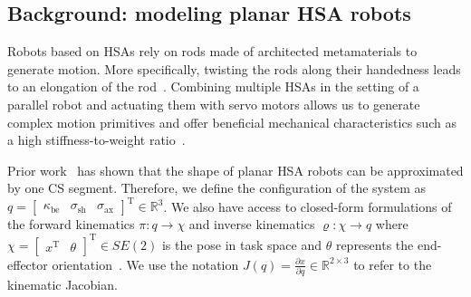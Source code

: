 \subsection{Background: modeling planar HSA robots}
Robots based on \glspl{HSA} rely on rods made of architected metamaterials to generate motion.  %
More specifically, twisting the rods along their handedness leads to an elongation of the rod~\cite{good2022expanding}. Combining multiple \glspl{HSA} in the setting of a parallel robot and actuating them with servo motors allows us to generate complex motion primitives and offer beneficial mechanical characteristics such as a high stiffness-to-weight ratio~\cite{stolzle2023modelling, good2022expanding}.

Prior work~\cite{stolzle2024experimental} has shown that the shape of planar \gls{HSA} robots can be approximated by one \gls{CS} segment. Therefore, we define the configuration of the system as $q = \begin{bmatrix}
    \kappa_\mathrm{be} & \sigma_\mathrm{sh} & \sigma_\mathrm{ax}
\end{bmatrix}^\mathrm{T} \in \mathbb{R}^3$.
We also have access to closed-form formulations of the forward kinematics $\pi: q \rightarrow \chi$ and inverse kinematics $\varrho: \chi \rightarrow q$ where $\chi = \begin{bmatrix}
    x^\mathrm{T} & \theta
\end{bmatrix}^\mathrm{T} \in SE(2)$ is the pose in task space and $\theta$ represents the end-effector orientation~\cite{stolzle2024experimental}.
We use the notation $J(q) = \frac{\partial x}{\partial q} \in \mathbb{R}^{2\times3}$ to refer to the kinematic Jacobian.

